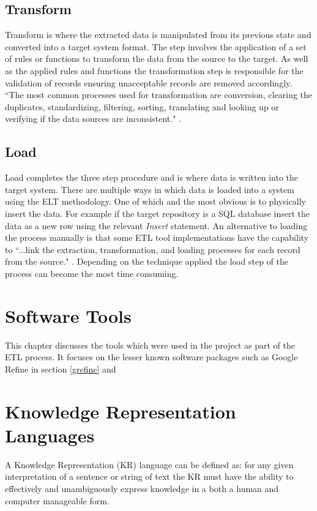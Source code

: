 \subsection{Transform}
Transform is where the extracted data is manipulated from its previous state and converted into a target system format. The step involves the application of a set of rules or functions to transform the data from the source to the target. As well as the applied rules and functions the transformation step is responsible for the validation of records ensuring unacceptable records are removed accordingly. ``The most common processes used for transformation are conversion, clearing the duplicates, standardizing, filtering, sorting, translating and looking up or verifying if the data sources are inconsistent." \cite{etlref2}.

\subsection{Load}
Load completes the three step procedure and is where data is written into the target system. There are multiple ways in which data is loaded into a system using the ELT methodology. One of which and the most obvious is to physically insert the data. For example if the target repository is a SQL database insert the data as a new row using the relevant \textit{Insert} statement. An alternative to loading the process manually is that some ETL tool implementations have the capability to ``...link the extraction, transformation, and loading processes for each record from the source." \cite{etlref2}. Depending on the technique applied the load step of the process can become the most time consuming.

\section{Software Tools}\label{softwaretools}

This chapter discusses the tools which were used in the project as part of the ETL process. It focuses on the lesser known software packages such as Google Refine in section \ref{grefine} and

\section{Knowledge Representation Languages}
A Knowledge Representation (KR) language can be defined as: for any given interpretation of a sentence or string of text the KR must have the ability to effectively and unambiguously express knowledge in a both a human and computer manageable form. 

